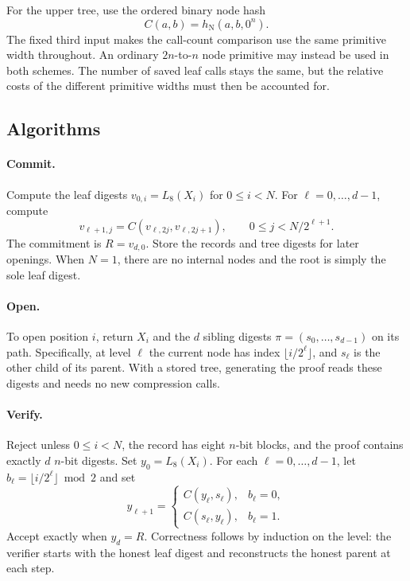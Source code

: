\documentclass[11pt,letterpaper]{article}
\theoremstyle{definition} %
\begin{document}
For the upper tree, use the ordered binary node hash
\begin{equation}
 C(a,b)=h_{\mathrm N}(a,b,0^n).
 \label{eq:node}
\end{equation}
The fixed third input makes the call-count comparison use the same primitive
width throughout. An ordinary $2n$-to-$n$ node primitive may instead be used
in both schemes. The number of saved leaf calls stays the same, but the
relative costs of the different primitive widths must then be accounted for.

\subsection{Algorithms}
\paragraph{Commit.}
Compute the leaf digests $v_{0,i}=L_8(X_i)$ for $0\leq i<N$. For
$\ell=0,\ldots,d-1$, compute
\begin{equation}
 v_{\ell+1,j}=C(v_{\ell,2j},v_{\ell,2j+1}),
 \qquad 0\leq j<N/2^{\ell+1}.
 \label{eq:commit}
\end{equation}
The commitment is $R=v_{d,0}$. Store the records and tree digests for later
openings. When $N=1$, there are no internal nodes and the root is simply
the sole leaf digest.

\paragraph{Open.}
To open position $i$, return $X_i$ and the $d$ sibling digests
$\pi=(s_0,\ldots,s_{d-1})$ on its path. Specifically, at level $\ell$ the
current node has index $\lfloor i/2^\ell\rfloor$, and $s_\ell$ is the
other child of its parent. With a stored tree, generating the proof reads
these digests and needs no new compression calls.

\paragraph{Verify.}
Reject unless $0\leq i<N$, the record has eight $n$-bit blocks, and the
proof contains exactly $d$ $n$-bit digests. Set $y_0=L_8(X_i)$. For each
$\ell=0,\ldots,d-1$, let $b_\ell=\lfloor i/2^\ell\rfloor\bmod2$ and set
\begin{equation}
 y_{\ell+1}=
 \begin{cases}
 C(y_\ell,s_\ell),&b_\ell=0,\\
 C(s_\ell,y_\ell),&b_\ell=1.
 \end{cases}
 \label{eq:verify}
\end{equation}
Accept exactly when $y_d=R$. Correctness follows by induction on the level:
the verifier starts with the honest leaf digest and reconstructs the honest
parent at each step.
\end{document}
